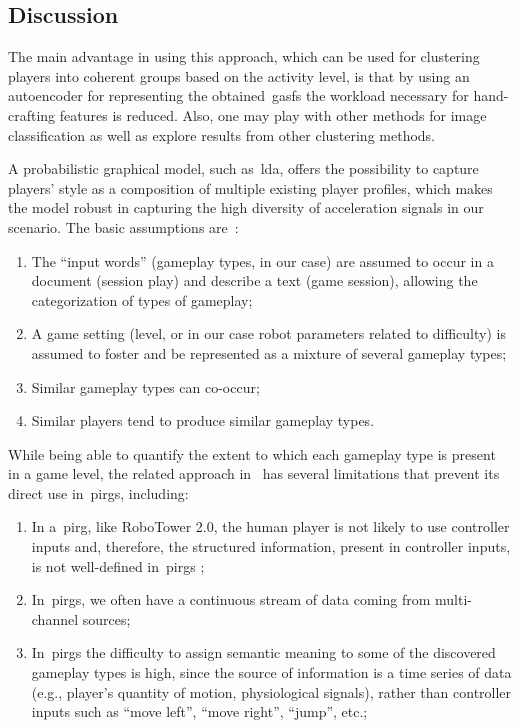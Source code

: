 \subsection{Discussion}
The main advantage in using this approach, which can be used for clustering players into coherent groups based on the activity level, is that by using an autoencoder for representing the obtained~\gls{gasf}s the workload necessary for hand-crafting features is reduced. Also, one may play with other methods for image classification  as well as explore results from other clustering methods.

A probabilistic graphical model, such as~\gls{lda}, offers the possibility to capture players' style as a composition of multiple existing player profiles, which makes the model robust in capturing the high diversity of acceleration signals in our scenario. The basic assumptions are~\citep{smith_mining_2016}:

\begin{enumerate}[label=\Alph*.]
\item The ``input words'' (gameplay types, in our case) are assumed to occur in a document (session play) and describe a text (game session), allowing the categorization of types of gameplay;
\item A game setting (level, or in our case robot parameters related to difficulty) is assumed to foster and be represented as a mixture of several gameplay types;
\item Similar gameplay types can co-occur;
\item Similar players tend to produce similar gameplay types.
\end{enumerate}

While being able to quantify the extent to which each gameplay type is present in a game level, the related approach in~\cite{smith_mining_2016} has several limitations that prevent its direct use in~\gls{pirg}s, including:

\begin{enumerate}[label=\Roman*.]
    \item In a~\gls{pirg}, like RoboTower 2.0, the human player is not likely to use controller inputs and, therefore, the structured information, present in controller inputs, is not well-defined in~\gls{pirg}s ;
    \item In~\gls{pirg}s, we often have a continuous stream of data coming from multi-channel sources;
    \item In~\gls{pirg}s the difficulty to assign semantic meaning to some of the discovered gameplay types is high, since the source of information is a time series of data (e.g., player's quantity of motion, physiological signals), rather than controller inputs such as ``move left'', ``move right'', ``jump'', etc.;

\end{enumerate}

